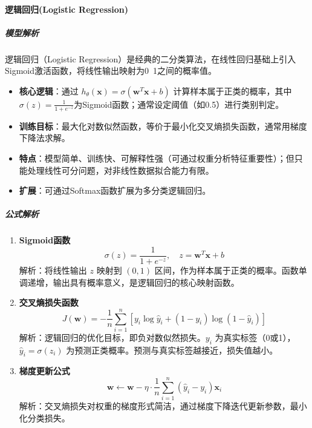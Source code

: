 \documentclass[12pt]{article}
\begin{document}
\paragraph{逻辑回归(Logistic Regression)}
\subparagraph{模型解析}
逻辑回归（Logistic Regression）是经典的二分类算法，在线性回归基础上引入Sigmoid激活函数，将线性输出映射为0~1之间的概率值。
\begin{itemize}
    \item \textbf{核心逻辑}：通过 $h_\theta(\boldsymbol{x}) = \sigma(\boldsymbol{w}^T \boldsymbol{x} + b)$ 计算样本属于正类的概率，其中$\sigma(z)=\frac{1}{1+e^{-z}}$为Sigmoid函数；通常设定阈值（如0.5）进行类别判定。
    \item \textbf{训练目标}：最大化对数似然函数，等价于最小化交叉熵损失函数，通常用梯度下降法求解。
    \item \textbf{特点}：模型简单、训练快、可解释性强（可通过权重分析特征重要性）；但只能处理线性可分问题，对非线性数据拟合能力有限。
    \item \textbf{扩展}：可通过Softmax函数扩展为多分类逻辑回归。
\end{itemize}

\subparagraph{公式解析}
\begin{enumerate}
    \item \textbf{Sigmoid函数}
    \[
    \sigma(z) = \frac{1}{1 + e^{-z}},\quad z = \boldsymbol{w}^T \boldsymbol{x} + b
    \]
    解析：将线性输出 $z$ 映射到 $(0,1)$ 区间，作为样本属于正类的概率。函数单调递增，输出具有概率意义，是逻辑回归的核心映射函数。

    \item \textbf{交叉熵损失函数}
    \[
    J(\boldsymbol{w}) = -\frac{1}{n} \sum_{i=1}^n \left[ y_i \log \hat{y}_i + (1-y_i) \log (1-\hat{y}_i) \right]
    \]
    解析：逻辑回归的优化目标，即负对数似然损失。$y_i$ 为真实标签（0或1），$\hat{y}_i=\sigma(z_i)$ 为预测正类概率。预测与真实标签越接近，损失值越小。

    \item \textbf{梯度更新公式}
    \[
    \boldsymbol{w} \leftarrow \boldsymbol{w} - \eta \cdot \frac{1}{n} \sum_{i=1}^n (\hat{y}_i - y_i) \boldsymbol{x}_i
    \]
    解析：交叉熵损失对权重的梯度形式简洁，通过梯度下降迭代更新参数，最小化分类损失。
\end{enumerate}
\end{document}
